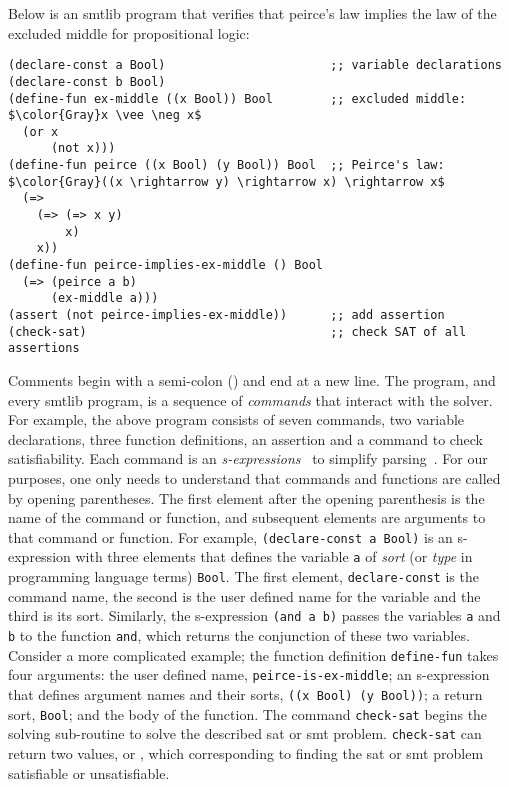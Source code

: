 Below is an \acl{smtlib} program that verifies that peirce's law implies the law
of the excluded middle for propositional logic:
%
\begin{lstlisting}[columns=flexible,keepspaces=true,language=SMTLIB]
(declare-const a Bool)                       ;; variable declarations
(declare-const b Bool)
(define-fun ex-middle ((x Bool)) Bool        ;; excluded middle: $\color{Gray}x \vee \neg x$
  (or x
      (not x)))
(define-fun peirce ((x Bool) (y Bool)) Bool  ;; Peirce's law: $\color{Gray}((x \rightarrow y) \rightarrow x) \rightarrow x$
  (=>
    (=> (=> x y)
        x)
    x))
(define-fun peirce-implies-ex-middle () Bool
  (=> (peirce a b)
      (ex-middle a)))
(assert (not peirce-implies-ex-middle))      ;; add assertion
(check-sat)                                  ;; check SAT of all assertions
\end{lstlisting}
%
Comments begin with a semi-colon (\rn{;}) and end at a new line. The program,
and every \acl{smtlib} program, is a sequence of \emph{commands} that interact
with the solver. For example, the above program consists of seven commands, two
variable declarations, three function definitions, an assertion and a command to
check satisfiability. Each command is an
\emph{s-expressions}~\cite{10.1145/367177.367199} to simplify
parsing~\cite{BarFT-SMTLIB}. For our purposes, one only needs to understand that
commands and functions are called by opening parentheses. The first element
after the opening parenthesis is the name of the command or function, and
subsequent elements are arguments to that command or function. For example,
\lstinline{(declare-const a Bool)} is an s-expression with three elements that
defines the \pl{} variable \lstinline{a} of \emph{sort} (or \emph{type} in
programming language terms) \lstinline{Bool}. The first element,
\lstinline{declare-const} is the command name, the second is the user defined
name for the variable and the third is its sort. Similarly, the s-expression
\lstinline{(and a b)} passes the variables \lstinline{a} and \lstinline{b} to
the function \lstinline{and}, which returns the conjunction of these two
variables. Consider a more complicated example; the function definition
\lstinline{define-fun} takes four arguments: the user defined name,
\lstinline{peirce-is-ex-middle}; an s-expression that defines argument names and
their sorts, \lstinline{((x Bool) (y Bool))}; a return sort, \lstinline{Bool};
and the body of the function. The command \lstinline{check-sat} begins the
solving sub-routine to solve the described \ac{sat} or \ac{smt} problem.
\lstinline{check-sat} can return two values,  or , which
corresponding to finding the \ac{sat} or \ac{smt} problem satisfiable or
unsatisfiable.


